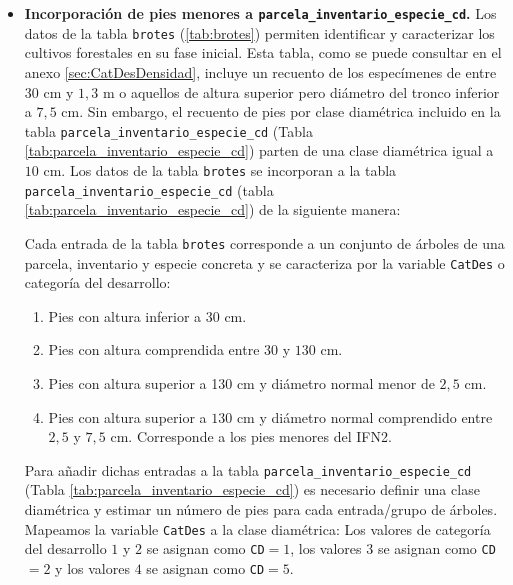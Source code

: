 \begin{itemize}
    \medskip
    
    \item \textbf{Incorporación de pies menores a \texttt{parcela\_inventario\_especie\_cd}.} Los datos de la tabla \texttt{brotes} (\ref{tab:brotes}) permiten identificar y caracterizar los cultivos forestales en su fase inicial. Esta tabla, como se puede consultar en el anexo \ref{sec:CatDesDensidad}, incluye un recuento de los especímenes de entre $30$ cm y $1,3$ m o aquellos de altura superior pero diámetro del tronco inferior a $7,5$ cm. Sin embargo, el recuento de pies por clase diamétrica incluido en la tabla \texttt{parcela\_inventario\_especie\_cd} (Tabla \ref{tab:parcela_inventario_especie_cd}) parten de una clase diamétrica igual a $10$ cm. Los datos de la tabla \texttt{brotes} se incorporan a la tabla \texttt{parcela\_inventario\_especie\_cd} (tabla \ref{tab:parcela_inventario_especie_cd}) de la siguiente manera: 
    
    \medskip
    
    Cada entrada de la tabla \texttt{brotes} corresponde a un conjunto de árboles de una parcela, inventario y especie concreta y se caracteriza por la variable \texttt{CatDes} o categoría del desarrollo: 
    
    \begin{enumerate}
        \item Pies con altura inferior a $30$ cm.
        \item Pies con altura comprendida entre $30$ y $130$ cm.
        \item Pies con altura superior a 130 cm y diámetro normal menor de $2,5$ cm.
        \item Pies con altura superior a $130$ cm y diámetro normal comprendido entre $2,5$ y $7,5$ cm. Corresponde a los pies menores del IFN2.
    \end{enumerate}
    
    \medskip
    
    Para añadir dichas entradas a la tabla \texttt{parcela\_inventario\_especie\_cd} (Tabla \ref{tab:parcela_inventario_especie_cd}) es necesario definir una clase diamétrica y estimar un número de pies para cada entrada/grupo de árboles. Mapeamos la variable \texttt{CatDes} a la clase diamétrica: Los valores de categoría del desarrollo $1$ y $2$ se asignan como \texttt{CD}$=1$, los valores $3$ se asignan como \texttt{CD}$=2$ y los valores $4$ se asignan como \texttt{CD}$=5$. 
    
    \medskip
    

\end{itemize}
